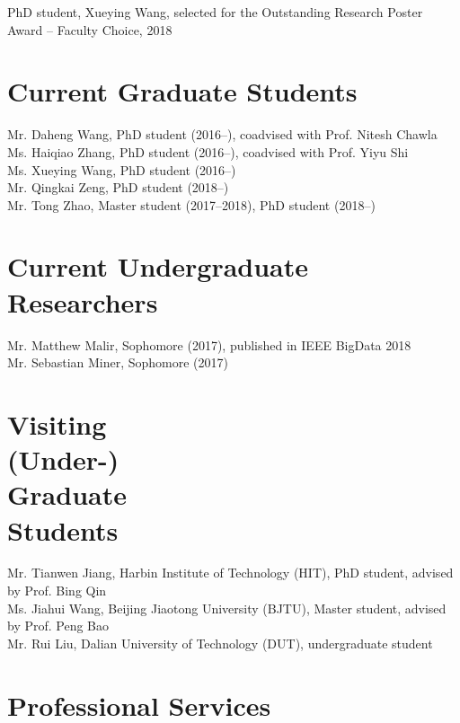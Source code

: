 \documentclass[margin, 9pt]{res}
\begin{document}
\begin{resume}
{PhD student, Xueying Wang, selected for the Outstanding Research Poster Award -- Faculty Choice, 2018}


\section{Current Graduate Students}

{Mr. Daheng Wang, PhD student (2016--), coadvised with Prof. Nitesh Chawla} \\
{Ms. Haiqiao Zhang, PhD student (2016--), coadvised with Prof. Yiyu Shi} \\
{Ms. Xueying Wang, PhD student (2016--)} \\
{Mr. Qingkai Zeng, PhD student (2018--)} \\
{Mr. Tong Zhao, Master student (2017--2018), PhD student (2018--)}

\section{Current Undergraduate Researchers}

{Mr. Matthew Malir}, Sophomore (2017), published in IEEE BigData 2018 \\
{Mr. Sebastian Miner}, Sophomore (2017) \\

\section{Visiting \\ (Under-) \\ Graduate \\ Students}

{Mr. Tianwen Jiang, Harbin Institute of Technology (HIT), PhD student, advised by Prof. Bing Qin} \\
{Ms. Jiahui Wang, Beijing Jiaotong University (BJTU), Master student, advised by Prof. Peng Bao} \\
{Mr. Rui Liu, Dalian University of Technology (DUT), undergraduate student}

\section{Professional Services}


\end{resume}
\end{document}
